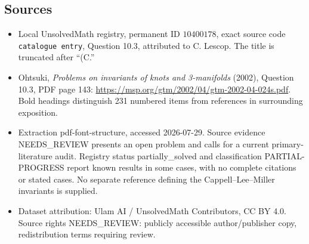 \documentclass[11pt]{article}
\begin{document}
\subsection{Sources}
\begin{itemize}
\item Local UnsolvedMath registry, permanent ID \(10400178\), exact source code \texttt{catalogue entry}, Question 10.3, attributed to C. Lescop. The title is truncated after ``(C.''
\item Ohtsuki, \emph{Problems on invariants of knots and 3-manifolds} (2002), Question 10.3, PDF page 143: \url{https://msp.org/gtm/2002/04/gtm-2002-04-024s.pdf}. Bold headings distinguish 231 numbered items from references in surrounding exposition.
\item Extraction pdf-font-structure, accessed 2026-07-29. Source evidence NEEDS\_REVIEW presents an open problem and calls for a current primary-literature audit. Registry status partially\_solved and classification PARTIAL-PROGRESS report known results in some cases, with no complete citations or stated cases. No separate reference defining the Cappell--Lee--Miller invariants is supplied.
\item Dataset attribution: Ulam AI / UnsolvedMath Contributors, CC BY 4.0. Source rights NEEDS\_REVIEW: publicly accessible author/publisher copy, redistribution terms requiring review.
\end{itemize}
\end{document}
